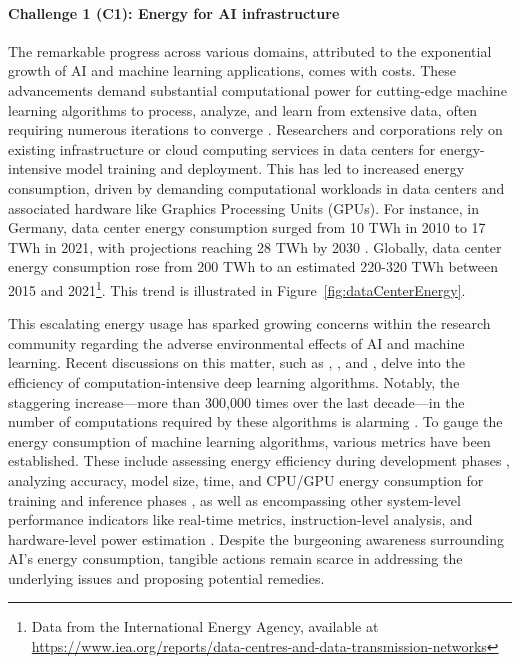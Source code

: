 \documentclass[12pt]{article}
\begin{document}
\paragraph*{\textbf{Challenge 1} (C1): Energy for AI infrastructure}
The remarkable progress across various domains, attributed to the exponential growth of AI and machine learning applications, comes with costs. These advancements demand substantial computational power for cutting-edge machine learning algorithms to process, analyze, and learn from extensive data, often requiring numerous iterations to converge \cite{Strubell2019EnergyPolicyConsiderations}. Researchers and corporations rely on existing infrastructure or cloud computing services in data centers for energy-intensive model training and deployment. This has led to increased energy consumption, driven by demanding computational workloads in data centers and associated hardware like Graphics Processing Units (GPUs). For instance, in Germany, data center energy consumption surged from 10 TWh in 2010 to 17 TWh in 2021, with projections reaching 28 TWh by 2030 \cite{Hintemann2022Cloudcomputingdrives}. Globally, data center energy consumption rose from 200 TWh to an estimated 220-320 TWh between 2015 and 2021\footnote{Data from the International Energy Agency, available at \url{https://www.iea.org/reports/data-centres-and-data-transmission-networks}}. This trend is illustrated in Figure~\ref{fig:dataCenterEnergy}.

This escalating energy usage has sparked growing concerns within the research community regarding the adverse environmental effects of AI and machine learning. Recent discussions on this matter, such as \cite{schwartz2019green}, \cite{vinuesa2020role}, and \cite{Strubell2019EnergyPolicyConsiderations}, delve into the efficiency of computation-intensive deep learning algorithms. Notably, the staggering increase---more than 300,000 times over the last decade---in the number of computations required by these algorithms is alarming \cite{schwartz2019green}. To gauge the energy consumption of machine learning algorithms, various metrics have been established. These include assessing energy efficiency during development phases \cite{zhou2020hulk}, analyzing accuracy, model size, time, and CPU/GPU energy consumption for training and inference phases \cite{Dalgren2019GreenMLA}, as well as encompassing other system-level performance indicators like real-time metrics, instruction-level analysis, and hardware-level power estimation \cite{garcia2019estimation}. Despite the burgeoning awareness surrounding AI's energy consumption, tangible actions remain scarce in addressing the underlying issues and proposing potential remedies.
\end{document}

